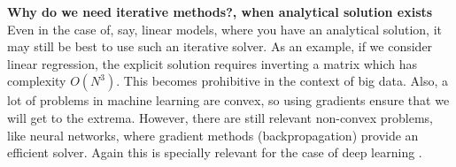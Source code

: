 \textbf{Why do we need iterative methods?, when analytical solution exists}\cite{iter} \\

\noindent Even in the case of, say, linear models, where you have an analytical solution, it may still be best to use such an iterative solver. As an example, if we consider linear regression, the explicit solution requires inverting a matrix which has complexity $O(N^3)$. This becomes prohibitive in the context of big data. Also, a lot of problems in machine learning are convex, so using gradients ensure that we will get to the extrema. However, there are still relevant non-convex problems, like neural networks, where gradient methods (backpropagation) provide an efficient solver. Again this is specially relevant for the case of deep learning \cite{iter}.
